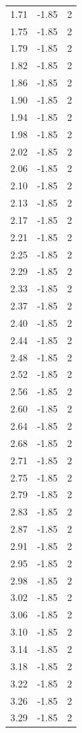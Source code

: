\begin{longtable}{lrr}
  1.71 & -1.85 & 2 \\
  1.75 & -1.85 & 2 \\
  1.79 & -1.85 & 2 \\
  1.82 & -1.85 & 2 \\
  1.86 & -1.85 & 2 \\
  1.90 & -1.85 & 2 \\
  1.94 & -1.85 & 2 \\
  1.98 & -1.85 & 2 \\
  2.02 & -1.85 & 2 \\
  2.06 & -1.85 & 2 \\
  2.10 & -1.85 & 2 \\
  2.13 & -1.85 & 2 \\
  2.17 & -1.85 & 2 \\
  2.21 & -1.85 & 2 \\
  2.25 & -1.85 & 2 \\
  2.29 & -1.85 & 2 \\
  2.33 & -1.85 & 2 \\
  2.37 & -1.85 & 2 \\
  2.40 & -1.85 & 2 \\
  2.44 & -1.85 & 2 \\
  2.48 & -1.85 & 2 \\
  2.52 & -1.85 & 2 \\
  2.56 & -1.85 & 2 \\
  2.60 & -1.85 & 2 \\
  2.64 & -1.85 & 2 \\
  2.68 & -1.85 & 2 \\
  2.71 & -1.85 & 2 \\
  2.75 & -1.85 & 2 \\
  2.79 & -1.85 & 2 \\
  2.83 & -1.85 & 2 \\
  2.87 & -1.85 & 2 \\
  2.91 & -1.85 & 2 \\
  2.95 & -1.85 & 2 \\
  2.98 & -1.85 & 2 \\
  3.02 & -1.85 & 2 \\
  3.06 & -1.85 & 2 \\
  3.10 & -1.85 & 2 \\
  3.14 & -1.85 & 2 \\
  3.18 & -1.85 & 2 \\
  3.22 & -1.85 & 2 \\
  3.26 & -1.85 & 2 \\
  3.29 & -1.85 & 2 \\

\end{longtable}
